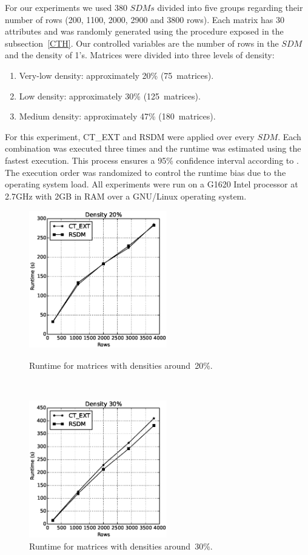 \documentclass[authoryear,11pt]{elsarticle}
\begin{document}
	For our experiments we used 380 $SDMs$ divided into five groups regarding their number of rows (200,
	1100, 2000, 2900 and 3800 rows). Each matrix has 30 attributes and was randomly generated using the procedure
	exposed in the subsection~\ref{CTH}. Our controlled variables are the number of rows in the $SDM$ and the
	density of 1's. Matrices were divided into three levels of density:
	
	\begin{enumerate}
		\item Very-low density: approximately 20\% (75~matrices).
		\item Low density: approximately 30\% (125~matrices).
		\item Medium density: approximately 47\% (180~matrices).
	\end{enumerate}
	
	For this experiment, CT\_EXT and RSDM were applied over every $SDM$. 
	Each combination was executed three times and the runtime was estimated using the fastest execution. This
	process 	ensures a 95\% confidence interval according to \cite{Haveraaen01}. 
	The execution order was randomized to control the runtime bias due to the operating system load. All 
	experiments were run on a G1620 Intel processor at 2.7GHz with 2GB in RAM over a GNU/Linux operating system.
	
	\begin{figure}[htb]
	\centering
	\begin{minipage}{.45\textwidth}
	  \centering
	   \includegraphics[width=6cm , height=6cm]{vlow_density.eps}
	  \caption{Runtime for matrices with densities around~20\%.}
	  \label{fig:vlow}
	\end{minipage}%
	~~~
	\begin{minipage}{.45\textwidth}
	  \centering
	   \includegraphics[width=6cm , height=6cm]{low_density1.eps}
	  \caption{Runtime for matrices with densities around~30\%.}
	  \label{fig:low}
	\end{minipage}
	\end{figure}
	
\end{document}
